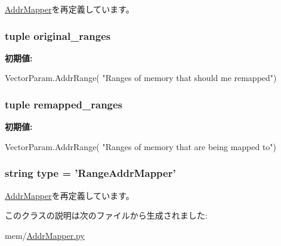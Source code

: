 \hyperlink{classAddrMapper_1_1AddrMapper_a17da7064bc5c518791f0c891eff05fda}{AddrMapper}を再定義しています。\hypertarget{classAddrMapper_1_1RangeAddrMapper_a41478a5c05152cdacb3c68ed86c79473}{
\subsubsection[{original\_\-ranges}]{\setlength{\rightskip}{0pt plus 5cm}tuple {\bf original\_\-ranges}}}
\label{classAddrMapper_1_1RangeAddrMapper_a41478a5c05152cdacb3c68ed86c79473}
{\bfseries 初期値:}
\begin{DoxyCode}
VectorParam.AddrRange(
        "Ranges of memory that should me remapped")
\end{DoxyCode}
\hypertarget{classAddrMapper_1_1RangeAddrMapper_a70414aad46e0a883b83c336aa5ee6363}{
\subsubsection[{remapped\_\-ranges}]{\setlength{\rightskip}{0pt plus 5cm}tuple {\bf remapped\_\-ranges}}}
\label{classAddrMapper_1_1RangeAddrMapper_a70414aad46e0a883b83c336aa5ee6363}
{\bfseries 初期値:}
\begin{DoxyCode}
VectorParam.AddrRange(
        "Ranges of memory that are being mapped to")
\end{DoxyCode}
\hypertarget{classAddrMapper_1_1RangeAddrMapper_acce15679d830831b0bbe8ebc2a60b2ca}{
\subsubsection[{type}]{\setlength{\rightskip}{0pt plus 5cm}string {\bf type} = '{\bf RangeAddrMapper}'}}
\label{classAddrMapper_1_1RangeAddrMapper_acce15679d830831b0bbe8ebc2a60b2ca}


\hyperlink{classAddrMapper_1_1AddrMapper_acce15679d830831b0bbe8ebc2a60b2ca}{AddrMapper}を再定義しています。

このクラスの説明は次のファイルから生成されました:\begin{DoxyCompactItemize}
\item 
mem/\hyperlink{AddrMapper_8py}{AddrMapper.py}\end{DoxyCompactItemize}
